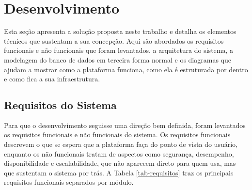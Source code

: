 \section{Desenvolvimento}

Esta seção apresenta a solução proposta neste trabalho e detalha os elementos
técnicos que sustentam a sua concepção. Aqui são abordados os requisitos
funcionais e não funcionais que foram levantados, a arquitetura do sistema, a
modelagem do banco de dados em terceira forma normal e os diagramas que ajudam a
mostrar como a plataforma funciona, como ela é estruturada por dentro e como
fica a sua infraestrutura.

\subsection{Requisitos do Sistema}

Para que o desenvolvimento seguisse uma direção bem definida, foram levantados
os requisitos funcionais e não funcionais do sistema. Os requisitos funcionais
descrevem o que se espera que a plataforma faça do ponto de vista do usuário,
enquanto os não funcionais tratam de aspectos como segurança, desempenho,
disponibilidade e escalabilidade, que não aparecem direto para quem usa, mas
que sustentam o sistema por trás. A Tabela \ref{tab-requisitos} traz os
principais requisitos funcionais separados por módulo.

